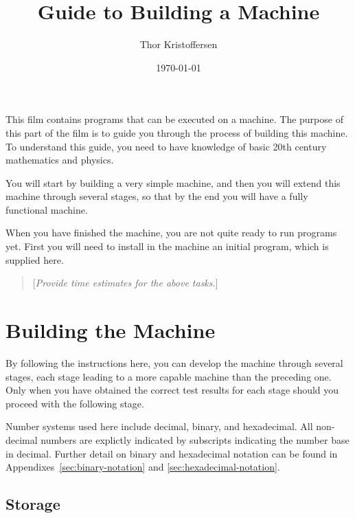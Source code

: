 \documentclass[a4paper,11pt]{article}
\author{Thor Kristoffersen}
\date{\today}
\title{Guide to Building a Machine}
\newcommand{\comment}[1]{\begin{quote}[\textit{#1}]\end{quote}}
\begin{document}
\maketitle

\noindent
This film contains programs that can be executed on a machine.
The purpose of this part of the film is to guide you through the process of building this machine.
To understand this guide, you need to have knowledge of basic 20th century mathematics and physics.

You will start by building a very simple machine, and then you will extend this machine through several stages, so that by the end you will have a fully functional machine.

When you have finished the machine, you are not quite ready to run programs yet.
First you will need to install in the machine an initial program, which is supplied here.

\comment{Provide time estimates for the above tasks.}

\section{Building the Machine}
\label{sec:building-machine}

By following the instructions here, you can develop the machine through several stages, each stage leading to a more capable machine than the preceding one.
Only when you have obtained the correct test results for each stage should you proceed with the following stage.

Number systems used here include decimal, binary, and hexadecimal.
All non-decimal numbers are explictly indicated by subscripts indicating the number base in decimal.
Further detail on binary and hexadecimal notation can be found in Appendixes~\ref{sec:binary-notation} and \ref{sec:hexadecimal-notation}.

\subsection{Storage}
\end{document}
